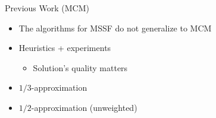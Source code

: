 \begin{frame}{Previous Work (MCM)}
\begin{itemize}[<+->]
	\item The algorithms for MSSF do not generalize to MCM  
	\item Heuristics + experiments
  		\begin{itemize}[<+->]
  			\item Solution's quality \alert{matters}
		\end{itemize}
		\item $1/3$-approximation 
		\item $1/2$-approximation (unweighted) 
\end{itemize}
\end{frame}